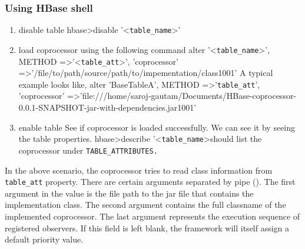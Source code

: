 \documentclass[11pt,a4paper,bibtotoc,idxtotoc,headsepline,footsepline,footexclude,BCOR12mm,DIV13]{scrbook}
\begin{document}
\subsubsection{Using HBase shell}
\begin{enumerate}
	\item disable table \newline
			\space \space hbase\textgreater disable '\textless \texttt{table\_name}\textgreater'
	\item load coprocessor using the following command \newline
	alter '\textless \texttt{table\_name}\textgreater', \newline 
	METHOD =\textgreater '\textless \texttt{table\_att}\textgreater', 'coprocessor' =\textgreater '/file/to/path\text{\textbar}\newline/source/path/to/impementation/class\text{\textbar}1001\text{\textbar}'
	\newline \newline
	A typical example looks like,\newline \newline
	alter 'BaseTableA', METHOD =\textgreater '\texttt{table\_att}', 'coprocessor' =\textgreater 'file:///home/saroj-gautam/Documents/HBase-coprocessor-0.0.1-SNAPSHOT-jar-with-dependencies.jar\text{\textbar}\texttt {}\text{\textbar}1001\text{\textbar}'
	
	\item enable table \newline
	See if coprocessor is loaded successfully. We can see it by seeing the table properties. \newline 
	hbase\textgreater describe '\textless \texttt{table\_name}\textgreater \space should list the coprocessor under \texttt{TABLE\_ATTRIBUTES.} \newline

\end{enumerate}

In the above scenario, the coprocessor tries to read class information from \texttt{table\_att} property. There are certain arguments separated by pipe (\text{\textbar}). The first argument in the value is the file path to the jar file that contains the implementation class. The second argument contains the full classname of the implemented coprocessor. The last argument represents the execution sequence of registered observers. If this field is left blank, the framework will itself assign a default priority value\cite{hbase:site}.
\end{document}
